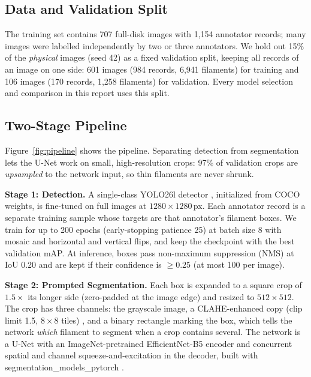 \documentclass[sigconf]{acmart}
\begin{document}
\subsection{Data and Validation Split}
The training set contains 707 full-disk images with 1,154 annotator records; many images were labelled independently by two or three annotators. We hold out 15\% of the \emph{physical} images (seed 42) as a fixed validation split, keeping all records of an image on one side: 601 images (984 records, 6,941 filaments) for training and 106 images (170 records, 1,258 filaments) for validation. Every model selection and comparison in this report uses this split.

\subsection{Two-Stage Pipeline}
Figure~\ref{fig:pipeline} shows the pipeline. Separating detection from segmentation lets the U-Net work on small, high-resolution crops: 97\% of validation crops are \emph{upsampled} to the network input, so thin filaments are never shrunk.

    \textbf{Stage 1: Detection.} A single-class YOLO26l detector \cite{jocher2026ultralyticsyolo26unifiedrealtime}, initialized from COCO weights, is fine-tuned on full images at $1280\times1280$\,px. Each annotator record is a separate training sample whose targets are that annotator's filament boxes. We train for up to 200 epochs (early-stopping patience 25) at batch size 8 with mosaic and horizontal and vertical flips, and keep the checkpoint with the best validation mAP. At inference, boxes pass non-maximum suppression (NMS) at IoU 0.20 and are kept if their confidence is $\geq 0.25$ (at most 100 per image).

    \textbf{Stage 2: Prompted Segmentation.} Each box is expanded to a square crop of $1.5\times$ its longer side (zero-padded at the image edge) and resized to $512\times512$. The crop has three channels: the grayscale image, a CLAHE-enhanced copy (clip limit 1.5, $8\times8$ tiles) \cite{zuiderveld1994clahe}, and a binary rectangle marking the box, which tells the network \emph{which} filament to segment when a crop contains several. The network is a U-Net \cite{ronneberger2015unet} with an ImageNet-pretrained EfficientNet-B5 encoder \cite{tan2019efficientnet} and concurrent spatial and channel squeeze-and-excitation \cite{roy2018scse} in the decoder, built with segmentation\_models\_pytorch \cite{smp}.
\end{document}
